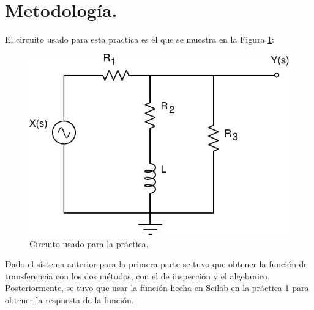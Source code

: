 \documentclass[12pt,a4paper]{article}
\newcounter{ns}
\begin{document}
\section{Metodología.}
El circuito usado para esta practica es el que se muestra en la Figura \ref{Figura1}:\\
\begin{figure}[h!]
\centering
\includegraphics[scale=0.7]{Circuito.pdf}
\caption{Circuito usado para la práctica.}
\label{Figura1}
\end{figure}

\newpage
Dado el sistema anterior para la primera parte se tuvo que obtener la función de transferencia con los dos métodos, con el de inspección y el algebraico. Posteriormente, se tuvo que usar la función hecha en Scilab en la práctica 1 para obtener la respuesta de la función.
\end{document}
